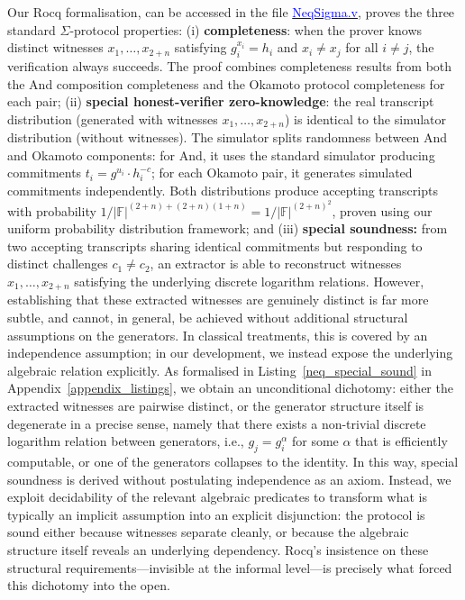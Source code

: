 Our Rocq formalisation, can be accessed in the file \href{https://anonymous.4open.science/r/SigmaProtocol-EBA5/src/Crypto/NeqSigma.v}{\textcolor{blue}{NeqSigma.v}}, proves the three standard $\Sigma$-protocol properties: (i) \textbf{completeness}:
when the prover knows distinct witnesses $x_1, \ldots, x_{2+n}$ satisfying $g_i^{x_i} = h_i$ and $x_i \neq x_j$
for all $i \neq j$, the verification always succeeds. The proof combines completeness results from both the And composition completeness and the Okamoto protocol completeness for each pair; (ii) \textbf{special honest-verifier zero-knowledge}:
the real transcript distribution (generated with witnesses $x_1, \ldots, x_{2+n}$) is identical to the
simulator distribution (without witnesses). The simulator splits randomness between And and Okamoto
components: for And, it uses the standard simulator producing commitments $t_i = g^{u_i} \cdot h_i^{-c}$;
for each Okamoto pair, it generates simulated commitments independently. Both distributions produce
accepting transcripts with probability $1/|\mathbb{F}|^{(2+n) + (2+n)(1+n)} = 1/|\mathbb{F}|^{(2+n)^2}$, proven
using our uniform probability distribution framework; and (iii) \textbf{special soundness:} from two accepting transcripts sharing identical commitments but responding to distinct challenges \(c_1 \neq c_2\), an extractor is able to reconstruct witnesses \(x_1, \ldots, x_{2+n}\) satisfying the underlying discrete logarithm relations.  However, establishing that these extracted witnesses are genuinely distinct is far more subtle, and cannot, in general, be achieved without additional structural assumptions on the generators. In classical treatments, this is covered by an independence assumption; in our development, we instead expose the underlying algebraic relation explicitly. As formalised in Listing~\ref{neq_special_sound} in Appendix~\ref{appendix_listings}, we obtain an unconditional dichotomy: either the extracted witnesses are pairwise distinct, or the generator structure itself is degenerate in a precise sense, namely that there exists a non-trivial discrete logarithm relation between generators, i.e., \(g_j = g_i^\alpha\) for some \(\alpha\) that is efficiently computable, or one of the generators collapses to the identity.  In this way, special soundness is derived without postulating independence as an axiom. Instead, we exploit decidability of the relevant algebraic predicates to transform what is typically an implicit assumption into an explicit disjunction:
the protocol is sound either because witnesses separate cleanly, or because the algebraic structure itself reveals an underlying dependency. Rocq's insistence on these structural requirements---invisible at the informal level---is precisely what forced this dichotomy into the open.

